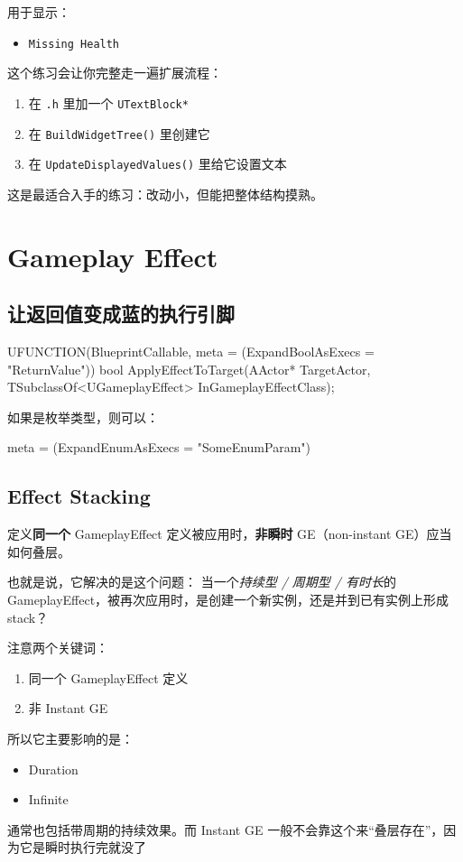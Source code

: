 用于显示：

\begin{itemize}
	\item \texttt{Missing Health}
\end{itemize}

这个练习会让你完整走一遍扩展流程：

\begin{enumerate}
	\item 在 \texttt{.h} 里加一个 \texttt{UTextBlock*}
	\item 在 \texttt{BuildWidgetTree()} 里创建它
	\item 在 \texttt{UpdateDisplayedValues()} 里给它设置文本
\end{enumerate}

这是最适合入手的练习：改动小，但能把整体结构摸熟。
\chapter{Gameplay Effect}
\section{让返回值变成蓝的执行引脚}
\begin{code}
	UFUNCTION(BlueprintCallable, meta = (ExpandBoolAsExecs = "ReturnValue"))
	bool ApplyEffectToTarget(AActor* TargetActor, TSubclassOf<UGameplayEffect> InGameplayEffectClass);
\end{code}
如果是枚举类型，则可以：
\begin{code}
	meta = (ExpandEnumAsExecs = "SomeEnumParam")
\end{code}
\section{Effect Stacking}

定义\textbf{同一个} GameplayEffect 定义被应用时，\textbf{非瞬时} GE（non-instant GE）应当如何叠层。

也就是说，它解决的是这个问题：
当一个\emph{持续型 / 周期型 / 有时长}的 GameplayEffect，被再次应用时，是创建一个新实例，还是并到已有实例上形成 stack？

注意两个关键词：
\begin{enumerate}
	\item 同一个 GameplayEffect 定义
	\item 非 Instant GE
\end{enumerate}

所以它主要影响的是：
\begin{itemize}
	\item Duration
	\item Infinite
\end{itemize}
通常也包括带周期的持续效果。而 Instant GE 一般不会靠这个来“叠层存在”，因为它是瞬时执行完就没了

